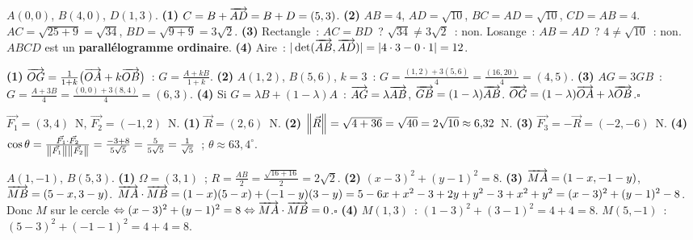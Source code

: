 
$A(0,0)$, $B(4,0)$, $D(1,3)$.
\textbf{(1)} $C=B+\overrightarrow{AD}=B+D=(5,3)$.
\textbf{(2)} $AB=4$, $AD=\sqrt{10}$, $BC=AD=\sqrt{10}$, $CD=AB=4$.
$AC=\sqrt{25+9}=\sqrt{34}$, $BD=\sqrt{9+9}=3\sqrt{2}$.
\textbf{(3)} Rectangle~: $AC=BD$~? $\sqrt{34}\ne3\sqrt{2}$~: non.
Losange~: $AB=AD$~? $4\ne\sqrt{10}$~: non.
$ABCD$ est un \textbf{parall\'elogramme ordinaire}.
\textbf{(4)} Aire~: $|\det(\overrightarrow{AB},\overrightarrow{AD})|=|4\cdot3-0\cdot1|=12$.


\textbf{(1)} $\overrightarrow{OG}=\frac{1}{1+k}\bigl(\overrightarrow{OA}+k\overrightarrow{OB}\bigr)$~:
$G=\frac{A+kB}{1+k}$.
\textbf{(2)} $A(1,2)$, $B(5,6)$, $k=3$~: $G=\frac{(1,2)+3(5,6)}{4}=\frac{(16,20)}{4}=(4,5)$.
\textbf{(3)} $AG=3GB$~: $G=\frac{A+3B}{4}=\frac{(0,0)+3(8,4)}{4}=(6,3)$.
\textbf{(4)} Si $G=\lambda B+(1-\lambda)A$~:
$\overrightarrow{AG}=\lambda\overrightarrow{AB}$, $\overrightarrow{GB}=(1-\lambda)\overrightarrow{AB}$.
$\overrightarrow{OG}=(1-\lambda)\overrightarrow{OA}+\lambda\overrightarrow{OB}$.\hfill$\square$


$\vec{F_1}=(3,4)$~N, $\vec{F_2}=(-1,2)$~N.
\textbf{(1)} $\vec{R}=(2,6)$~N.
\textbf{(2)} $\left\|\vec{R}\right\|=\sqrt{4+36}=\sqrt{40}=2\sqrt{10}\approx6{,}32$~N.
\textbf{(3)} $\vec{F_3}=-\vec{R}=(-2,-6)$~N.
\textbf{(4)} $\cos\theta=\frac{\vec{F_1}\cdot\vec{F_2}}{\left\|\vec{F_1}\right\|\left\|\vec{F_2}\right\|}
=\frac{-3+8}{5\sqrt{5}}=\frac{5}{5\sqrt{5}}=\frac{1}{\sqrt{5}}$~;
$\theta\approx63{,}4^{\circ}$.


$A(1,-1)$, $B(5,3)$.
\textbf{(1)} $\Omega=(3,1)$~; $R=\frac{AB}{2}=\frac{\sqrt{16+16}}{2}=2\sqrt{2}$.
\textbf{(2)} $(x-3)^2+(y-1)^2=8$.
\textbf{(3)} $\overrightarrow{MA}=(1-x,-1-y)$, $\overrightarrow{MB}=(5-x,3-y)$.
$\overrightarrow{MA}\cdot\overrightarrow{MB}=(1-x)(5-x)+(-1-y)(3-y)
=5-6x+x^2-3+2y+y^2-3+x^2+y^2=(x-3)^2+(y-1)^2-8$.
Donc $M$ sur le cercle $\Leftrightarrow(x-3)^2+(y-1)^2=8\Leftrightarrow\overrightarrow{MA}\cdot\overrightarrow{MB}=0$.\hfill$\square$
\textbf{(4)} $M(1,3)$~: $(1-3)^2+(3-1)^2=4+4=8$.\checkmark\quad
$M(5,-1)$~: $(5-3)^2+(-1-1)^2=4+4=8$.\checkmark


